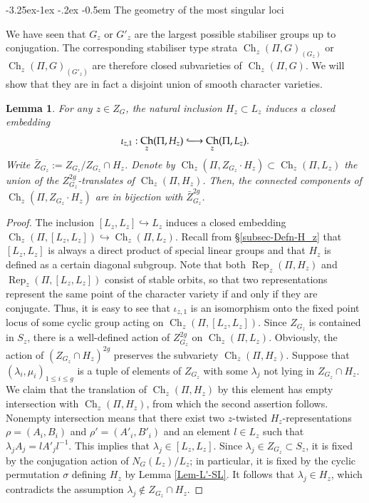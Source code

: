 \documentclass[11pt,oneside,dvipsnames]{amsart}
\makeatletter
\renewcommand\subsection{\@startsection{subsection}{3}{\z@}%
                                     {-3.25ex\@plus -1ex \@minus -.2ex}%
                                     {-0.5em}%
                                     {\normalfont\normalsize\bfseries}}
\theoremstyle{plain}
\newtheorem{Lem}[Thm]{Lemma}
\theoremstyle{definition}
\theoremstyle{named}
\DeclareMathOperator{\Ch}{Ch}
\DeclareMathOperator{\Rep}{Rep}
\newcommand{\hooklongrightarrow}{\lhook\joinrel\longrightarrow}
\makeatother
\begin{document}
\subsection{The geometry of the most singular loci}\label{subsec-geom-sing-loci}\hfill

We have seen that $G_z$ or $G'_z$ are the largest possible stabiliser groups up to conjugation. The corresponding stabiliser type strata $\Ch_z(\Pi,G)_{(G_z)}$ or $\Ch_z(\Pi,G)_{(G'_z)}$ are therefore closed subvarieties of $\Ch_z(\Pi,G)$. We will show that they are in fact a disjoint union of smooth character varieties.

\begin{Lem}
For any $z\in Z_G$, the natural inclusion $H_z\subset L_z$ induces a closed embedding
$$
\iota_{z,1}:\Ch_z(\Pi,H_z)\hooklongrightarrow\Ch_z(\Pi,L_z).
$$
Write $\bar{Z}_{G_z}:=Z_{G_z}/Z_{G_z}\cap H_z$. Denote by $\Ch_z(\Pi,Z_{G_z}\cdot H_z)\subset\Ch_z(\Pi,L_z)$ the union of the $Z_{G_z}^{2g}$-translates of $\Ch_z(\Pi,H_z)$. Then, the connected components of $\Ch_z(\Pi,Z_{G_z}\cdot H_z)$ are in bijection with $\bar{Z}_{G_z}^{2g}$.
\end{Lem}
\begin{proof}
The inclusion $[L_z,L_z]\hookrightarrow L_z$ induces a closed embedding $\Ch_z(\Pi,[L_z,L_z])\hookrightarrow\Ch_z(\Pi,L_z)$. Recall from \S \ref{subsec-Defn-H_z} that $[L_z,L_z]$ is always a direct product of special linear groups and that $H_z$ is defined as a certain diagonal subgroup. Note that both $\Rep_z(\Pi,H_z)$ and $\Rep_z(\Pi,[L_z,L_z])$ consist of stable orbits, so that two representations represent the same point of the character variety if and only if they are conjugate. Thus, it is easy to see that $\iota_{z,1}$ is an isomorphism onto the fixed point locus of some cyclic group acting on $\Ch_z(\Pi,[L_z,L_z])$. Since $Z_{G_z}$ is contained in $S_z$, there is a well-defined action of $Z_{G_z}^{2g}$ on $\Ch_z(\Pi,L_z)$. Obviously, the action of $(Z_{G_z}\cap H_z)^{2g}$ preserves the subvariety $\Ch_z(\Pi,H_z)$. Suppose that $(\lambda_i,\mu_i)_{1\le i\le g}$ is a tuple of elements  of $Z_{G_z}$ with some $\lambda_j$ not lying in $Z_{G_z}\cap H_z$. We claim that the translation of $\Ch_z(\Pi,H_z)$ by this element has empty intersection with $\Ch_z(\Pi,H_z)$, from which the second assertion follows. Nonempty intersection means that there exist two $z$-twisted $H_z$-representations $\rho=(A_i,B_i)$ and $\rho'=(A'_i,B'_i)$ and an element $l\in L_z$ such that $\lambda_jA_j=lA'_jl^{-1}$. This implies that $\lambda_j\in[L_z,L_z]$. Since $\lambda_j\in Z_{G_z}\subset S_z$, it is fixed by the conjugation action of $N_G(L_z)/L_z$; in particular, it is fixed by the cyclic permutation $\sigma$ defining $H_z$ by Lemma \ref{Lem-L'-SL}. It follows that $\lambda_j\in H_z$, which contradicts the assumption $\lambda_j\notin Z_{G_z}\cap H_z$.
\end{proof}
\end{document}

